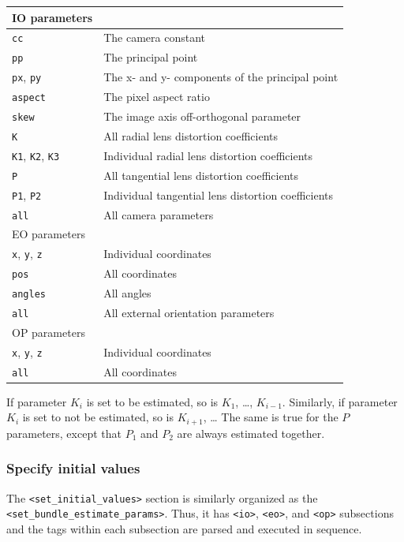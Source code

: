 \documentclass{article}
\begin{document}
\begin{center}
\begin{tabular}{l|l}
IO  parameters & \\
\hline
\texttt{cc} & The camera constant\\
\texttt{pp} & The principal point\\
\texttt{px}, \texttt{py} & The x- and y- components of the principal point\\
\texttt{aspect} & The pixel aspect ratio\\
\texttt{skew} & The image axis off-orthogonal parameter\\
\texttt{K} & All radial lens distortion coefficients\\
\texttt{K1}, \texttt{K2}, \texttt{K3} & Individual radial lens distortion coefficients\\
\texttt{P} & All tangential lens distortion coefficients\\
\texttt{P1}, \texttt{P2} & Individual tangential lens distortion coefficients\\
\texttt{all} & All camera parameters\\
\hline
EO parameters & \\
\hline
\texttt{x}, \texttt{y}, \texttt{z} & Individual coordinates\\
\texttt{pos} & All coordinates\\
\texttt{angles} & All angles\\
\texttt{all} & All external orientation parameters\\
\hline
OP parameters & \\
\hline
\texttt{x}, \texttt{y}, \texttt{z} & Individual coordinates\\
\texttt{all} & All coordinates\\
\end{tabular}
\end{center}

If parameter \(K_i\) is set to be estimated, so is \(K_1\), \ldots{},
\(K_{i-1}\). Similarly, if parameter \(K_i\) is set to not be estimated,
so is \(K_{i+1}\), \ldots{} The same is true for the \(P\) parameters, except
that \(P_1\) and \(P_2\) are always estimated together.

\subsubsection{Specify initial values}
\label{sec:setInitialValues}
The \texttt{<set\_initial\_values>} section is similarly organized as the
\texttt{<set\_bundle\_estimate\_params>}. Thus, it has \texttt{<io>}, \texttt{<eo>}, and
\texttt{<op>} subsections and the tags within each subsection are parsed and
executed in sequence.
\end{document}
